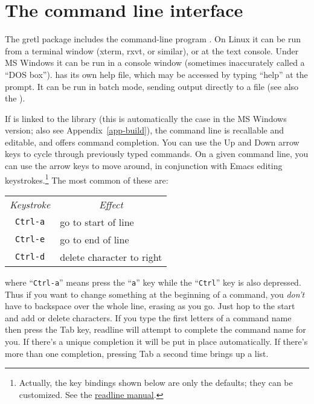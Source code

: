\chapter{The command line interface}
\label{chap:cli}

The gretl package includes the command-line program .
On Linux it can be run from a terminal window (xterm, rxvt, or
similar), or at the text console.  Under MS Windows it can be run in a
console window (sometimes inaccurately called a ``DOS box'').
 has its own help file, which may be accessed by typing
``help'' at the prompt. It can be run in batch mode, sending output
directly to a file (see also the \GCR).
    
If  is linked to the  library (this is
automatically the case in the MS Windows version; also see
Appendix~\ref{app-build}), the command line is recallable and
editable, and offers command completion.  You can use the Up and Down
arrow keys to cycle through previously typed commands.  On a given
command line, you can use the arrow keys to move around, in
conjunction with Emacs editing keystrokes.\footnote{Actually, the key
  bindings shown below are only the defaults; they can be customized.
  See the
  \href{http://cnswww.cns.cwru.edu/~chet/readline/readline.html}{readline
    manual}.} The most common of these are:
%    
\begin{center}
  \begin{tabular}{cl}
    \textit{Keystroke} & \multicolumn{1}{c}{\textit{Effect}}\\
    \verb+Ctrl-a+ & go to start of line\\
    \verb+Ctrl-e+ & go to end of line\\
    \verb+Ctrl-d+ & delete character to right\\
  \end{tabular}
\end{center}
%
where ``\verb+Ctrl-a+'' means press the ``\verb+a+'' key while the
``\verb+Ctrl+'' key is also depressed.  Thus if you want to change
something at the beginning of a command, you \emph{don't} have to
backspace over the whole line, erasing as you go.  Just hop to the
start and add or delete characters.  If you type the first letters of
a command name then press the Tab key, readline will attempt to
complete the command name for you.  If there's a unique completion it
will be put in place automatically.  If there's more than one
completion, pressing Tab a second time brings up a list.

